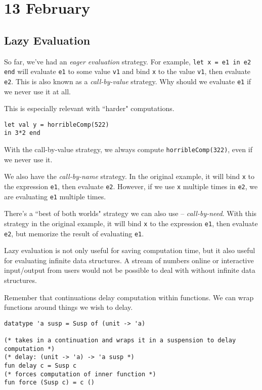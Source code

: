 \documentclass[11pt]{article}
\begin{document}
\section{13 February}
\subsection{Lazy Evaluation}

So far, we've had an \emph{eager evaluation} strategy. For example, \verb~let x = e1 in e2 end~ will evaluate \verb~e1~ to some value \verb~v1~ and bind \verb~x~ to the value \verb~v1~, then evaluate \verb~e2~. This is also known as a \emph{call-by-value} strategy. Why should we evaluate \verb~e1~ if we never use it at all.

This is especially relevant with ``harder" computations.

\begin{verbatim}
let val y = horribleComp(522)
in 3*2 end
\end{verbatim}

With the call-by-value strategy, we always compute \verb~horribleComp(322)~, even if we never use it.

We also have the \emph{call-by-name} strategy. In the original example, it will bind \verb~x~ to the expression \verb~e1~, then evaluate \verb~e2~. However, if we use \verb~x~ multiple times in \verb~e2~, we are evaluating \verb~e1~ multiple times.

There's a ``best of both worlds" strategy we can also use -- \emph{call-by-need}. With this strategy in the original example, it will bind \verb~x~ to the expression \verb~e1~, then evaluate \verb~e2~, but memorize the result of evaluating \verb~e1~.

Lazy evaluation is not only useful for saving computation time, but it also useful for evaluating infinite data structures. A stream of numbers online or interactive input/output from users would not be possible to deal with without infinite data structures.

Remember that continuations delay computation within functions. We can wrap functions around things we wish to delay.

\begin{verbatim}
datatype 'a susp = Susp of (unit -> 'a)

(* takes in a continuation and wraps it in a suspension to delay computation *)
(* delay: (unit -> 'a) -> 'a susp *)
fun delay c = Susp c
(* forces computation of inner function *)
fun force (Susp c) = c ()
\end{verbatim}
\end{document}
